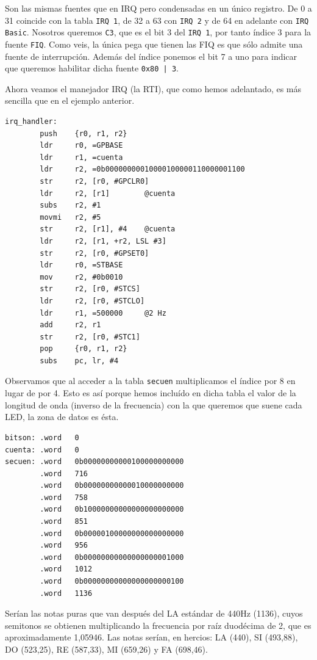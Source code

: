 Son las mismas fuentes que en IRQ pero condensadas en un único registro. De 0 a 31 coincide
con la tabla {\tt IRQ 1}, de 32 a 63 con {\tt IRQ 2} y de 64 en adelante con {\tt IRQ Basic}.
Nosotros queremos {\tt C3}, que es el bit 3 del {\tt IRQ 1}, por tanto índice 3 para la fuente
{\tt FIQ}. Como veis, la única pega que tienen las FIQ es que sólo admite una fuente de
interrupción. Además del índice ponemos el bit 7 a uno para indicar que queremos habilitar
dicha fuente {\tt 0x80 | 3}.

Ahora veamos el manejador IRQ (la RTI), que como hemos adelantado, es más sencilla que en el
ejemplo anterior.

\begin{lstlisting}
irq_handler:
        push    {r0, r1, r2}
        ldr     r0, =GPBASE
        ldr     r1, =cuenta
        ldr     r2, =0b00000000010000100000110000001100
        str     r2, [r0, #GPCLR0]
        ldr     r2, [r1]        @cuenta
        subs    r2, #1
        movmi   r2, #5
        str     r2, [r1], #4    @cuenta
        ldr     r2, [r1, +r2, LSL #3]
        str     r2, [r0, #GPSET0]
        ldr     r0, =STBASE
        mov     r2, #0b0010
        str     r2, [r0, #STCS]
        ldr     r2, [r0, #STCLO]
        ldr     r1, =500000     @2 Hz
        add     r2, r1
        str     r2, [r0, #STC1]
        pop     {r0, r1, r2}
        subs    pc, lr, #4
\end{lstlisting}

Observamos que al acceder a la tabla {\tt secuen} multiplicamos el índice por 8 en lugar de
por 4. Esto es así porque hemos incluído en dicha tabla el valor de la longitud de onda (inverso
de la frecuencia) con la que queremos que suene cada LED, la zona de datos es ésta.

\begin{lstlisting}
bitson: .word   0
cuenta: .word   0
secuen: .word   0b00000000000100000000000
        .word   716
        .word   0b00000000000010000000000
        .word   758
        .word   0b10000000000000000000000
        .word   851
        .word   0b00000100000000000000000
        .word   956
        .word   0b00000000000000000001000
        .word   1012
        .word   0b00000000000000000000100
        .word   1136
\end{lstlisting}

Serían las notas puras que van después del LA estándar de 440Hz (1136), cuyos semitonos se
obtienen multiplicando la frecuencia por raíz duodécima de 2, que es aproximadamente 1,05946.
Las notas serían, en hercios: LA (440), SI (493,88), DO (523,25), RE (587,33), MI (659,26) y
FA (698,46).

